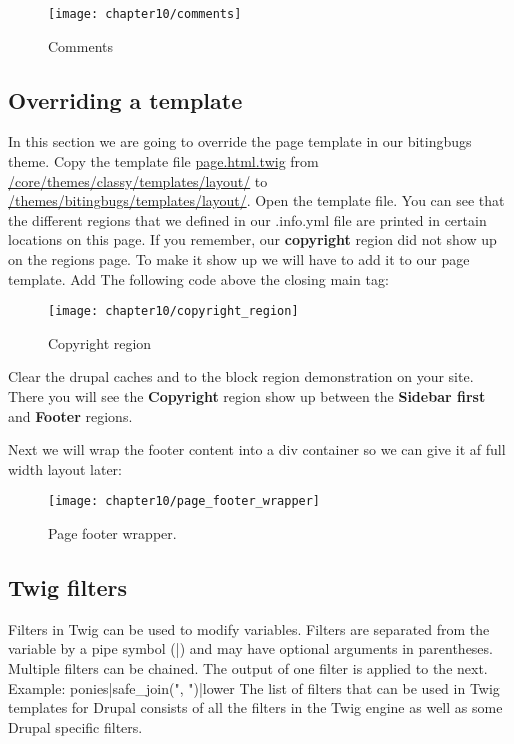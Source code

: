 \begin{figure}[H]
	\centering
	\texttt{[image: chapter10/comments]}
	\caption{Comments}
	\label{fig:comments}
\end{figure}

\subsection{Overriding a template}
In this section we are going to override the page template in our bitingbugs theme. Copy the template file \url{page.html.twig} from \url{/core/themes/classy/templates/layout/} to \url{/themes/bitingbugs/templates/layout/}. Open the template file. You can see that the different regions that we defined in our .info.yml file are printed in certain locations on this page. If you remember, our \textbf{copyright} region did not show up on the regions page. To make it show up we will have to add it to our page template. Add The following code above the closing main tag:

\begin{figure}[H]
	\centering
	\texttt{[image: chapter10/copyright\_region]}
	\caption{Copyright region}
	\label{fig:copyright_region}
\end{figure}


Clear the drupal caches and to the block region demonstration on your site. There you will see the \textbf{Copyright} region show up between the \textbf{Sidebar first} and \textbf{Footer} regions.

Next we will wrap the footer content into a div container so we can give it af full width layout later:

\begin{figure}[H]
	\centering
	\texttt{[image: chapter10/page\_footer\_wrapper]}
	\caption{Page footer wrapper.}
	\label{fig:page_footer_wrapper}
\end{figure}

\subsection{Twig filters}
Filters in Twig can be used to modify variables. Filters are separated from the variable by a pipe symbol (|) and may have optional arguments in parentheses. Multiple filters can be chained. The output of one filter is applied to the next.
Example: {{ ponies|safe\_join(", ")|lower}}
The list of filters that can be used in Twig templates for Drupal consists of all the filters in the Twig engine as well as some Drupal specific filters.

